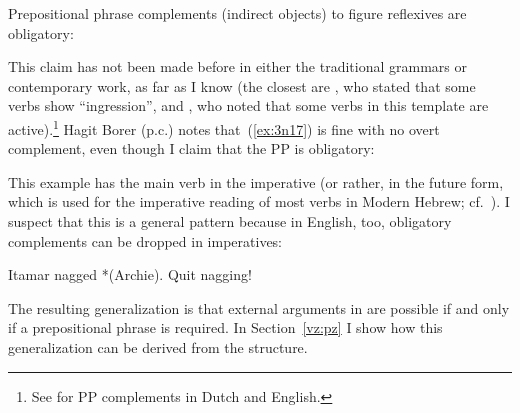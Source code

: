 \begin{exe}
\begin{xlist}
\begin{xlist}
\begin{exe}
\begin{xlist}
\begin{xlist}
\begin{exe}
\begin{xlist}
\begin{xlist}
\begin{exe}
\begin{exe}
\begin{xlist}
\begin{exe}
\begin{exe}
\begin{xlist}
\begin{exe}
\begin{exe}
\begin{exe}
\begin{exe}
\begin{exe}
\begin{xlist}
 \begin{exe}
 \ex  Prepositional phrase complements (indirect objects) to figure reflexives are obligatory:  \label{ex:vz:pp}
 \begin{xlist} 
	
	
 \z
\z 

This claim has not been made before in either the traditional grammars or contemporary work, as far as I know (the closest are \citealt[87]{berman78}, who stated that some verbs show ``ingression'', and \citealt{schwarzwald08}, who noted that some verbs in this template are active).\footnote{See \cite{neeleman97} for PP complements in Dutch and English.} Hagit Borer (p.c.) notes that~(\ref{ex:3n17}) is fine with no overt complement, even though I claim that the PP is obligatory:
 \begin{exe}
	
 \z 

This example has the main verb in the imperative (or rather, in the future form, which is used for the imperative reading of most verbs in Modern Hebrew; cf.~\citealt{batel02lang}). I suspect that this is a general pattern because in English, too, obligatory complements can be dropped in imperatives:
 \begin{exe}
 \ex  
 \begin{xlist} 
 	\ex  Itamar nagged *(Archie). 
 	\ex  Quit nagging! 
 \z
\z 

The resulting generalization is that external arguments in {\tnif} are possible if and only if a prepositional phrase is required. In Section~\ref{vz:pz} I show how this generalization can be derived from the structure.


\end{xlist}
\end{exe}
\end{exe}
\end{xlist}
\end{exe}
\end{xlist}
\end{exe}
\end{exe}
\end{exe}
\end{exe}
\end{exe}
\end{xlist}
\end{exe}
\end{exe}
\end{xlist}
\end{exe}
\end{exe}
\end{xlist}
\end{xlist}
\end{exe}
\end{xlist}
\end{xlist}
\end{exe}
\end{xlist}
\end{xlist}
\end{exe}
